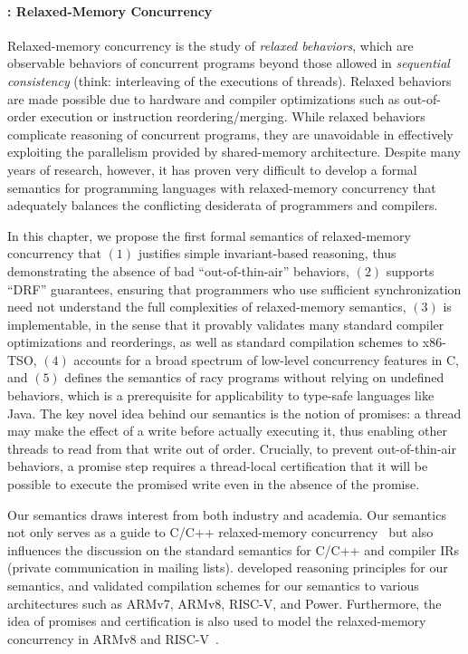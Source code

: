 \paragraph{: Relaxed-Memory Concurrency}

Relaxed-memory concurrency is the study of \emph{relaxed behaviors}, which are observable behaviors
of concurrent programs beyond those allowed in \emph{sequential consistency} (think: interleaving of
the executions of threads).  Relaxed behaviors are made possible due to hardware and compiler
optimizations such as out-of-order execution or instruction reordering/merging.  While relaxed
behaviors complicate reasoning of concurrent programs, they are unavoidable in effectively
exploiting the parallelism provided by shared-memory architecture.  Despite many years of research,
however, it has proven very difficult to develop a formal semantics for programming languages with
relaxed-memory concurrency that adequately balances the conflicting desiderata of programmers and
compilers.

In this chapter, we propose the first formal semantics of relaxed-memory concurrency that $(1)$
justifies simple invariant-based reasoning, thus demonstrating the absence of bad
``out-of-thin-air'' behaviors, $(2)$ supports ``DRF'' guarantees, ensuring that programmers who use
sufficient synchronization need not understand the full complexities of relaxed-memory semantics,
$(3)$ is implementable, in the sense that it provably validates many standard compiler optimizations
and reorderings, as well as standard compilation schemes to x86-TSO, $(4)$ accounts for a broad
spectrum of low-level concurrency features in C, and $(5)$ defines the semantics of racy programs
without relying on undefined behaviors, which is a prerequisite for applicability to type-safe
languages like Java.  The key novel idea behind our semantics is the notion of promises: a thread
may make the effect of a write before actually executing it, thus enabling other threads to read
from that write out of order.  Crucially, to prevent out-of-thin-air behaviors, a promise step
requires a thread-local certification that it will be possible to execute the promised write even in
the absence of the promise.

Our semantics draws interest from both industry and academia.  Our semantics not only serves as a
guide to C/C++ relaxed-memory concurrency~\cite{blog,niko} but also influences the discussion on the
standard semantics for C/C++ and compiler IRs (private communication in mailing lists).
\cite{viktor-logic} developed reasoning principles for our semantics, and \cite{viktor-compilation}
validated compilation schemes for our semantics to various architectures such as ARMv7, ARMv8,
RISC-V, and Power.  Furthermore, the idea of promises and certification is also used to model the
relaxed-memory concurrency in ARMv8 and RISC-V~\cite{promising-armv8-riscv}.

